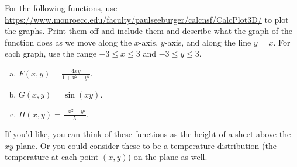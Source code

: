 \documentclass[12pt]{report} %
\theoremstyle{definition}
\begin{document}
For the following functions, use \url{https://www.monroecc.edu/faculty/paulseeburger/calcnsf/CalcPlot3D/} to plot the graphs.  Print them off and include them and describe what the graph of the function does as we move along the $x$-axis, $y$-axis, and along the line $y=x$. For each graph, use the range $-3\leq x \leq 3$ and $-3\leq y \leq 3$.
\begin{enumerate}[(a)]
    \item $F(x,y)=\frac{4xy}{1+x^2+y^2}$.
    \item $G(x,y)=\sin(xy)$.
    \item $H(x,y)=\frac{-x^2-y^2}{5}$.
\end{enumerate}
If you'd like, you can think of these functions as the height of a sheet above the $xy$-plane.  Or you could consider these to be a temperature distribution (the temperature at each point $(x,y)$) on the plane as well.
\end{document}
